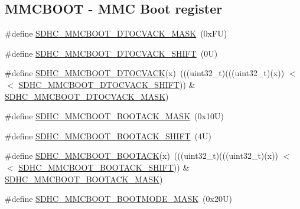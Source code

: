 \subsection*{M\+M\+C\+B\+O\+OT -\/ M\+MC Boot register}
\begin{DoxyCompactItemize}
\item 
\#define \mbox{\hyperlink{group___s_d_h_c___register___masks_ga243f17fb68ebb17a8a62a31a34530a1f}{S\+D\+H\+C\+\_\+\+M\+M\+C\+B\+O\+O\+T\+\_\+\+D\+T\+O\+C\+V\+A\+C\+K\+\_\+\+M\+A\+SK}}~(0x\+F\+U)
\item 
\#define \mbox{\hyperlink{group___s_d_h_c___register___masks_ga63ba85bfa2ccf68011e8afcf6f2c03b4}{S\+D\+H\+C\+\_\+\+M\+M\+C\+B\+O\+O\+T\+\_\+\+D\+T\+O\+C\+V\+A\+C\+K\+\_\+\+S\+H\+I\+FT}}~(0\+U)
\item 
\#define \mbox{\hyperlink{group___s_d_h_c___register___masks_ga51ddb837c8ee3f7997ab5e64bd5b6bfa}{S\+D\+H\+C\+\_\+\+M\+M\+C\+B\+O\+O\+T\+\_\+\+D\+T\+O\+C\+V\+A\+CK}}(x)~(((uint32\+\_\+t)(((uint32\+\_\+t)(x)) $<$$<$ \mbox{\hyperlink{group___s_d_h_c___register___masks_ga63ba85bfa2ccf68011e8afcf6f2c03b4}{S\+D\+H\+C\+\_\+\+M\+M\+C\+B\+O\+O\+T\+\_\+\+D\+T\+O\+C\+V\+A\+C\+K\+\_\+\+S\+H\+I\+FT}})) \& \mbox{\hyperlink{group___s_d_h_c___register___masks_ga243f17fb68ebb17a8a62a31a34530a1f}{S\+D\+H\+C\+\_\+\+M\+M\+C\+B\+O\+O\+T\+\_\+\+D\+T\+O\+C\+V\+A\+C\+K\+\_\+\+M\+A\+SK}})
\item 
\#define \mbox{\hyperlink{group___s_d_h_c___register___masks_ga878fce0feabab8806e311871a08386c9}{S\+D\+H\+C\+\_\+\+M\+M\+C\+B\+O\+O\+T\+\_\+\+B\+O\+O\+T\+A\+C\+K\+\_\+\+M\+A\+SK}}~(0x10\+U)
\item 
\#define \mbox{\hyperlink{group___s_d_h_c___register___masks_gadd901321f62235462c051a551b132354}{S\+D\+H\+C\+\_\+\+M\+M\+C\+B\+O\+O\+T\+\_\+\+B\+O\+O\+T\+A\+C\+K\+\_\+\+S\+H\+I\+FT}}~(4\+U)
\item 
\#define \mbox{\hyperlink{group___s_d_h_c___register___masks_ga9155da648b5d8de3c09eb5f5320a9b50}{S\+D\+H\+C\+\_\+\+M\+M\+C\+B\+O\+O\+T\+\_\+\+B\+O\+O\+T\+A\+CK}}(x)~(((uint32\+\_\+t)(((uint32\+\_\+t)(x)) $<$$<$ \mbox{\hyperlink{group___s_d_h_c___register___masks_gadd901321f62235462c051a551b132354}{S\+D\+H\+C\+\_\+\+M\+M\+C\+B\+O\+O\+T\+\_\+\+B\+O\+O\+T\+A\+C\+K\+\_\+\+S\+H\+I\+FT}})) \& \mbox{\hyperlink{group___s_d_h_c___register___masks_ga878fce0feabab8806e311871a08386c9}{S\+D\+H\+C\+\_\+\+M\+M\+C\+B\+O\+O\+T\+\_\+\+B\+O\+O\+T\+A\+C\+K\+\_\+\+M\+A\+SK}})
\item 
\#define \mbox{\hyperlink{group___s_d_h_c___register___masks_ga0cdf366302c98d1227b0092048c0ac5a}{S\+D\+H\+C\+\_\+\+M\+M\+C\+B\+O\+O\+T\+\_\+\+B\+O\+O\+T\+M\+O\+D\+E\+\_\+\+M\+A\+SK}}~(0x20\+U)

\end{DoxyCompactItemize}
